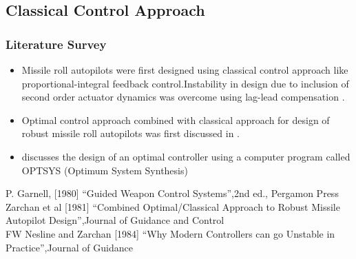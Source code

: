 \documentclass[10pt]{beamer}
\begin{document}
\subsection{Classical Control Approach}
\begin{frame}
\frametitle{Literature Survey}
\begin{itemize}
 \item Missile roll autopilots were first designed using classical control approach like proportional-integral feedback control.Instability in design due to inclusion of second order actuator dynamics was overcome using lag-lead compensation \cite{garnell}. \bigskip
 \item Optimal control approach combined with classical approach for design of robust missile roll autopilots was first discussed in \cite{zarchannesline81}. \bigskip
 \item \cite{zarchannesline1984} discusses the design of an optimal controller using a computer program called OPTSYS (Optimum System Synthesis) \bigskip
\end{itemize}
\vspace{.5cm}
\footnoterule
\tiny {\cite{garnell} P. Garnell, [1980] ``Guided Weapon Control Systems'',2nd ed., Pergamon Press} \\
\tiny {\cite{zarchannesline81} Zarchan et al [1981] ``Combined Optimal/Classical Approach to Robust Missile Autopilot Design'',Journal of Guidance and Control} \\
\tiny {\cite{zarchannesline1984} FW Nesline and Zarchan [1984] ``Why Modern Controllers can go Unstable in Practice'',Journal of Guidance}
\end{frame}
\end{document}
